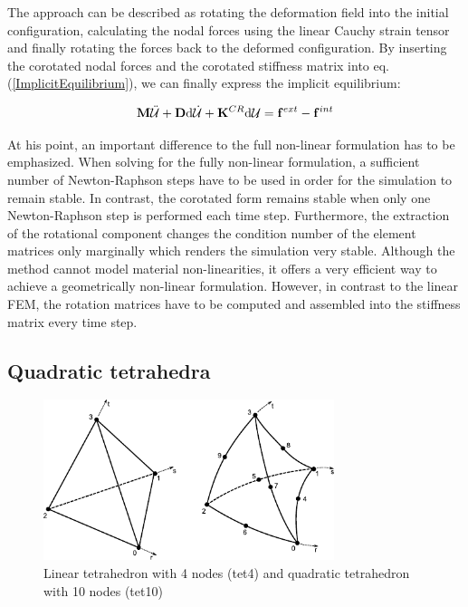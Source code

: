 The approach can be described as rotating the deformation field into the initial configuration, calculating the nodal forces using the linear Cauchy strain tensor and finally rotating the forces back to the deformed configuration. By inserting the corotated nodal forces and the corotated stiffness matrix into eq. (\ref{ImplicitEquilibrium}), we can finally express the implicit equilibrium:

\begin{equation}
\mathbf M\ddot{\mathcal{U} } + \mathbf D \textnormal{d}\dot{\mathcal{U}}  + \mathbf K^{CR} {\textnormal{d}{\mathcal{U}} } = \mathbf f ^{ext} - \mathbf f ^{int}
\label{CorotImplicitEquilibrium}
\end{equation}

At his point, an important difference to the full non-linear formulation has to be emphasized. When solving for the fully non-linear formulation, a sufficient number of Newton-Raphson steps have to be used in order for the simulation to remain stable. In contrast, the corotated form remains stable when only one Newton-Raphson step is performed each time step. Furthermore, the extraction of the rotational component changes the condition number of the element matrices only marginally which renders the simulation very stable.
Although the method cannot model material non-linearities, it offers a very efficient way to achieve a geometrically non-linear formulation. However, in contrast to the linear FEM, the rotation matrices have to be computed and assembled into the stiffness matrix every time step. 

\subsection{Quadratic tetrahedra}
\label{QuadraticTetrahedraSection}

\begin{figure}
   \centering   
\includegraphics[width=8.5cm]{Figures/Tet4and10.pdf}
\caption{Linear tetrahedron with 4 nodes (tet4) and quadratic tetrahedron with 10 nodes (tet10)}
\label{Tet4AndTet10Illustration}
\end{figure}


